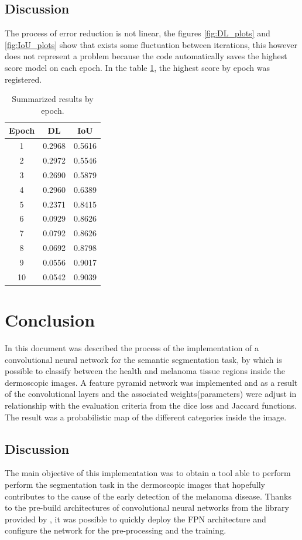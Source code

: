 \subsection{Discussion}

The process of error reduction is not linear, the figures \ref{fig:DL_plots} and \ref{fig:IoU_plots} show that exists some fluctuation between iterations, this however does not represent a problem because the code automatically saves the highest score model on each epoch. In the table \ref{table:summary}, the highest score by epoch was registered.

\begin{table}[b]
  \centering
  \caption{Summarized results by epoch.}
  \begin{tabular}{c c c}
    \toprule
    \textbf{Epoch} & \textbf{DL} & \textbf{IoU} \\
    \midrule
    1 & 0.2968 & 0.5616 \\
    2 & 0.2972 & 0.5546 \\
    3 & 0.2690 & 0.5879 \\
    4 & 0.2960 & 0.6389 \\
    5 & 0.2371 & 0.8415 \\
    6 & 0.0929 & 0.8626 \\
    7 & 0.0792 & 0.8626 \\
    8 & 0.0692 & 0.8798 \\
    9 & 0.0556 & 0.9017 \\
    10 & 0.0542 & 0.9039 \\
    \bottomrule
    
  \end{tabular}
  \label{table:summary}
\end{table}

\section{Conclusion}
In this document was described the process of the implementation of a convolutional neural network for the semantic segmentation task, by which is possible to classify between the health and melanoma tissue regions inside the dermoscopic images. A feature pyramid network was implemented and as a result of the convolutional layers and the associated weights(parameters) were adjust in relationship with the evaluation criteria from the dice loss and Jaccard functions. The result was a probabilistic map of the different categories inside the image.

\subsection{Discussion}
The main objective of this implementation was to obtain a tool able to perform perform the segmentation task in the dermoscopic images that hopefully contributes to the cause of the early detection of the melanoma disease. Thanks to the pre-build architectures of convolutional neural networks from the library provided by \citet{Yakubovskiy:2019}, it was possible to quickly deploy the FPN architecture and configure the network for the pre-processing and the training.

